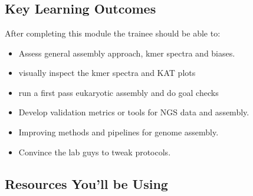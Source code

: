
\chapter{\moduleTitle}
\newpage


\section{Key Learning Outcomes}

After completing this module the trainee should be able to:
\begin{itemize}
  \item Assess general assembly approach, kmer spectra and biases.
  \item visually inspect the kmer spectra and KAT plots
  \item run a first pass eukaryotic assembly and do goal checks 
  \item Develop validation metrics or tools for NGS data and assembly.
  \item Improving methods and pipelines for genome assembly.
  \item Convince the lab guys to tweak protocols.

\end{itemize}

\section{Resources You'll be Using}
 
